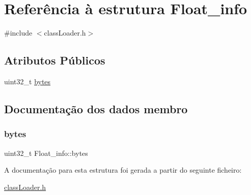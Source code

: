 \hypertarget{struct_float__info}{}\section{Referência à estrutura Float\+\_\+info}
\label{struct_float__info}


{\ttfamily \#include $<$class\+Loader.\+h$>$}

\subsection*{Atributos Públicos}
\begin{DoxyCompactItemize}
\item 
uint32\+\_\+t \hyperlink{struct_float__info_a7852def483615148467cd89bfb630d4e}{bytes}
\end{DoxyCompactItemize}


\subsection{Documentação dos dados membro}
\hypertarget{struct_float__info_a7852def483615148467cd89bfb630d4e}{}\label{struct_float__info_a7852def483615148467cd89bfb630d4e} 
\subsubsection{\texorpdfstring{bytes}{bytes}}
{\footnotesize\ttfamily uint32\+\_\+t Float\+\_\+info\+::bytes}



A documentação para esta estrutura foi gerada a partir do seguinte ficheiro\+:\begin{DoxyCompactItemize}
\item 
\hyperlink{class_loader_8h}{class\+Loader.\+h}\end{DoxyCompactItemize}
